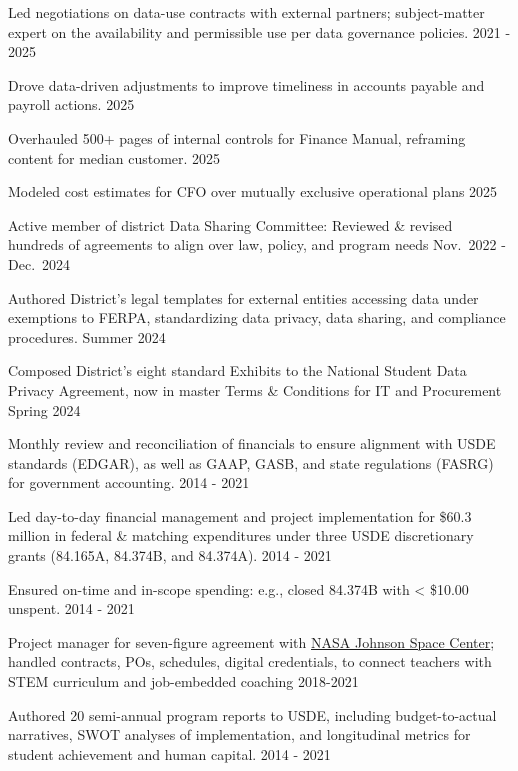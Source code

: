 \documentclass[
  11pt,
]
{article}
\renewenvironment{itemize}{
  \begin{list}{}{
    \setlength{\leftmargin}{1.5em}
  }
}{
  \end{list}
}
\begin{document}
\begin{itemize}
\item
  Led negotiations on data-use contracts with external partners;
  subject-matter expert on the availability and permissible use per data
  governance policies. \hfill 2021 - 2025
\item
  Drove data-driven adjustments to improve timeliness in accounts
  payable and payroll actions. \hfill 2025
\item
  Overhauled 500+ pages of internal controls for Finance Manual,
  reframing content for median customer. \hfill 2025
\item
  Modeled cost estimates for CFO over mutually exclusive operational
  plans \hfill 2025
\item
  Active member of district Data Sharing Committee: Reviewed \& revised
  hundreds of agreements to align over law, policy, and program needs
  \hfill Nov.~2022 - Dec.~2024
\item
  Authored District's legal templates for external entities accessing
  data under exemptions to FERPA, standardizing data privacy, data
  sharing, and compliance procedures. \hfill Summer 2024
\item
  Composed District's eight standard Exhibits to the National Student
  Data Privacy Agreement, now in master Terms \& Conditions for IT and
  Procurement \hfill Spring 2024
\item
  Monthly review and reconciliation of financials to ensure alignment
  with USDE standards (EDGAR), as well as GAAP, GASB, and state
  regulations (FASRG) for government accounting. \hfill 2014 - 2021
\item
  Led day-to-day financial management and project implementation for
  \$60.3 million in federal \& matching expenditures under three USDE
  discretionary grants (84.165A, 84.374B, and 84.374A). \hfill 2014 -
  2021
\item
  Ensured on-time and in-scope spending: e.g., closed 84.374B with
  \textless{} \$10.00 unspent. \hfill 2014 - 2021
\item
  Project manager for seven-figure agreement with
  \href{https://www.nasa.gov/learning-resources/for-educators/}{NASA
  Johnson Space Center}; handled contracts, POs, schedules, digital
  credentials, to connect teachers with STEM curriculum and job-embedded
  coaching \hfill 2018-2021
\item
  Authored 20 semi-annual program reports to USDE, including
  budget-to-actual narratives, SWOT analyses of implementation, and
  longitudinal metrics for student achievement and human capital.
  \hfill 2014 - 2021
\end{itemize}
\end{document}
